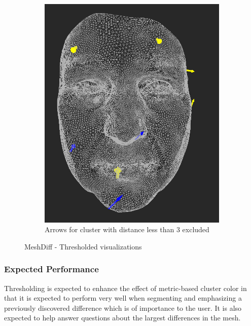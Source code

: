\begin{figure}[h]
    \qquad
    \begin{subfigure}{0.3\textwidth}
	\includegraphics[width=\textwidth]{./img/meshdiff-thresholding-arrows-length3.PNG}
    \caption{Arrows for cluster with distance less than 3 excluded}
    \label{fig:meshdiff_thresholding_arrows}
	\end{subfigure}
    
\caption{MeshDiff - Thresholded visualizations}
\end{figure}

\subsubsection{Expected Performance}

Thresholding is expected to enhance the effect of metric-based cluster color in that it is expected to perform very well when segmenting and emphasizing a previously discovered difference which is of importance to the user. It is also expected to help answer questions about the largest differences in the mesh.

